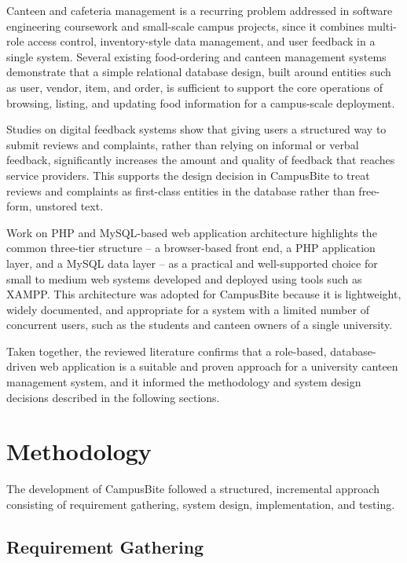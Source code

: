 \documentclass[ 12pt,a4paper,twocolumn,fleqn]{article}
\begin{document}
Canteen and cafeteria management is a recurring problem addressed in software engineering coursework and small-scale campus projects, since it combines multi-role access control, inventory-style data management, and user feedback in a single system. Several existing food-ordering and canteen management systems \cite{b1} demonstrate that a simple relational database design, built around entities such as user, vendor, item, and order, is sufficient to support the core operations of browsing, listing, and updating food information for a campus-scale deployment.

Studies on digital feedback systems \cite{b2} show that giving users a structured way to submit reviews and complaints, rather than relying on informal or verbal feedback, significantly increases the amount and quality of feedback that reaches service providers. This supports the design decision in CampusBite to treat reviews and complaints as first-class entities in the database rather than free-form, unstored text.

Work on PHP and MySQL-based web application architecture \cite{b3} highlights the common three-tier structure -- a browser-based front end, a PHP application layer, and a MySQL data layer -- as a practical and well-supported choice for small to medium web systems developed and deployed using tools such as XAMPP. This architecture was adopted for CampusBite because it is lightweight, widely documented, and appropriate for a system with a limited number of concurrent users, such as the students and canteen owners of a single university.

Taken together, the reviewed literature confirms that a role-based, database-driven web application is a suitable and proven approach for a university canteen management system, and it informed the methodology and system design decisions described in the following sections.

\section{Methodology}

The development of CampusBite followed a structured, incremental approach consisting of requirement gathering, system design, implementation, and testing.

\subsection{Requirement Gathering}
\end{document}
